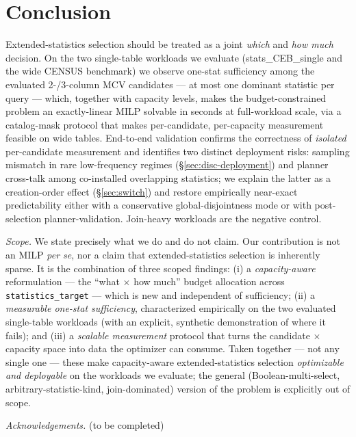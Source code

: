 \documentclass[sigconf, nonacm]{acmart}
\begin{document}
\section{Conclusion}
\label{sec:concl}

Extended-statistics selection should be treated as a joint \emph{which} and
\emph{how much} decision. On the two single-table workloads we evaluate
(stats\_CEB\_single and the wide CENSUS benchmark) we observe one-stat
sufficiency among the evaluated 2-/3-column MCV candidates --- at most one
dominant statistic per query --- which, together with capacity levels, makes the
budget-constrained problem an exactly-linear MILP solvable in seconds at
full-workload scale, via
a catalog-mask protocol that makes per-candidate, per-capacity measurement
feasible on wide tables. End-to-end validation confirms the correctness of
\emph{isolated} per-candidate measurement and identifies two distinct
deployment risks: sampling mismatch in rare low-frequency regimes
(\S\ref{sec:disc-deployment}) and planner cross-talk among co-installed
overlapping statistics; we explain the latter as a creation-order effect
(\S\ref{sec:switch}) and restore empirically near-exact predictability either
with a conservative global-disjointness mode or with post-selection
planner-validation. Join-heavy workloads are the negative control.

\emph{Scope.} We state precisely what we do and do not claim. Our contribution
is not an MILP \emph{per se}, nor a claim that extended-statistics selection is
inherently sparse. It is the combination of three scoped findings: (i) a
\emph{capacity-aware} reformulation --- the ``what $\times$ how much'' budget
allocation across \texttt{statistics\_target} --- which is new and independent
of sufficiency; (ii) a \emph{measurable one-stat sufficiency}, characterized
empirically on the two evaluated single-table workloads (with an explicit,
synthetic demonstration of where it fails); and (iii) a \emph{scalable
measurement} protocol that turns the candidate $\times$ capacity space into data
the optimizer can consume. Taken together --- not any single one --- these make
capacity-aware extended-statistics selection \emph{optimizable and
deployable} on the workloads we evaluate; the general (Boolean-multi-select,
arbitrary-statistic-kind, join-dominated) version of the problem is explicitly
out of scope.

\begin{acks}
\emph{Acknowledgements.} (to be completed)
\end{acks}



\end{document}
